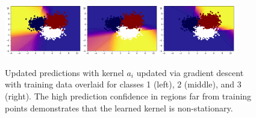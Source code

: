 \begin{figure}[!ht]
    \centering
        \includegraphics[width=0.3\textwidth]{c4_figures/svm1.png}\includegraphics[width=0.3\textwidth]{c4_figures/svm2.png}\includegraphics[width=0.3\textwidth]{c4_figures/svm3.png}
    \caption{Updated predictions with kernel $a_i$ updated via gradient descent with training data overlaid for classes 1 (left), 2 (middle), and 3 (right). The high prediction confidence in regions far from training points demonstrates that the learned kernel is non-stationary.}
    \label{fig:svm}
\end{figure}
